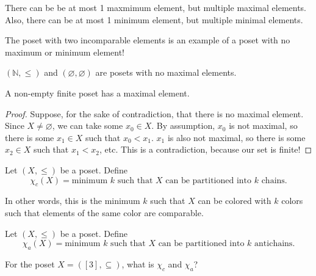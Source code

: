 \documentclass[a4paper]{article}
\begin{document}
\begin{note}
	There can be be at most 1 maxmimum element, but multiple maximal elements. Also, there can be at most 1 minimum element, but multiple minimal elements.
\end{note}

\begin{note}
	The poset with two incomparable elements is an example of a poset with no maximum or minimum element!
\end{note}

\begin{eg}
	\( (\mathbb{N}, \le ) \) and \( (\varnothing, \varnothing) \) are posets with no maximal elements.
\end{eg}

\begin{prop}
	A non-empty finite poset has a maximal element.
\end{prop}

\begin{proof}
	Suppose, for the sake of contradiction, that there is no maximal element. Since \( X \neq \varnothing \), we can take some \( x_{0} \in X\). By assumption, \( x_{0} \) is not maximal, so there is some \( x_{1}\in X \) such that \( x_{0}<x_{1} \). \( x_{1} \) is also not maximal, so there is some \( x_{2} \in X \) such that \( x_{1}<x_{2} \), etc. This is a contradiction, because our set is finite!
\end{proof}

\begin{definition}
	Let \( (X,\le ) \) be a poset. Define \[
		\chi_c(X) = \text{minimum } k \text{ such that } X \text{ can be partitioned into } k \text{ chains}
	.\] 
\end{definition}

\begin{note}
	In other words, this is the minimum \( k \) such that \( X \) can be colored with \( k \) colors such that elements of the same color are comparable.
\end{note}

\begin{definition}
	Let \( (X,\le ) \) be a poset. Define \[
		\chi_a(X) = \text{minimum } k \text{ such that } X \text{ can be partitioned into } k \text{ antichains}
	.\] 
\end{definition}

\begin{eg}
	For the poset \( X=([3],\subseteq) \), what is \( \chi_c \) and \( \chi_a \)? 
\end{eg}
\end{document}
